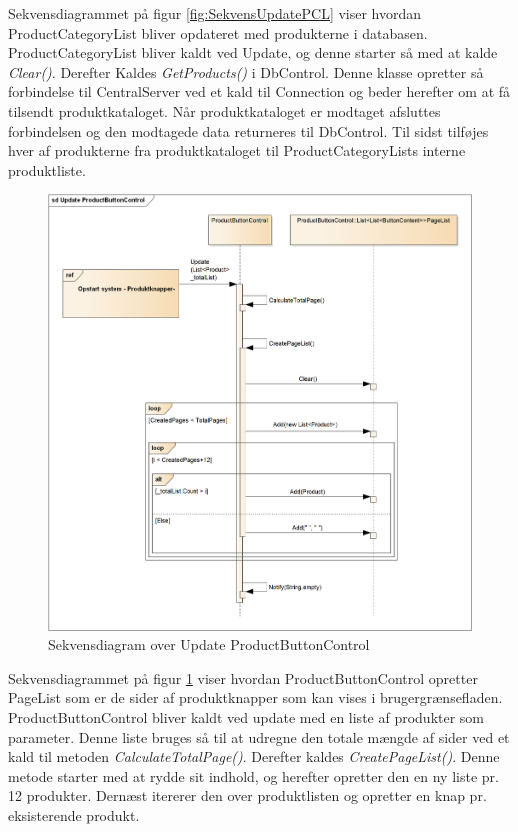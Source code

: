Sekvensdiagrammet på figur \ref{fig:SekvensUpdatePCL} viser hvordan ProductCategoryList bliver opdateret med produkterne i databasen. ProductCategoryList bliver kaldt ved Update, og denne starter så med at kalde \textit{Clear()}. Derefter Kaldes \textit{GetProducts()} i DbControl. Denne klasse opretter så forbindelse til CentralServer ved et kald til Connection og beder herefter om at få tilsendt produktkataloget. Når produktkataloget er modtaget afsluttes forbindelsen og den modtagede data returneres til DbControl. Til sidst tilføjes hver af produkterne fra produktkataloget til ProductCategoryLists interne produktliste.

\begin{figure}[H]
	\centering
	\includegraphics[width=1\textwidth]{Systemdesign/Frontend/GUI/DesignOgStruktur/Pics/UpdateProductButtonControl}
	\caption{Sekvensdiagram over Update ProductButtonControl}
	\label{fig:SekvensUpdatePBC}
\end{figure}

Sekvensdiagrammet på figur \ref{fig:SekvensUpdatePBC} viser hvordan ProductButtonControl opretter PageList som er de sider af produktknapper som kan vises i brugergrænsefladen. ProductButtonControl bliver kaldt ved update med en liste af produkter som parameter. Denne liste bruges så til at udregne den totale mængde af sider ved et kald til metoden \textit{CalculateTotalPage()}. Derefter kaldes \textit{CreatePageList()}. Denne metode starter med at rydde sit indhold, og herefter opretter den en ny liste pr. 12 produkter. Dernæst itererer den over produktlisten og opretter en knap pr. eksisterende produkt.

\newpage
